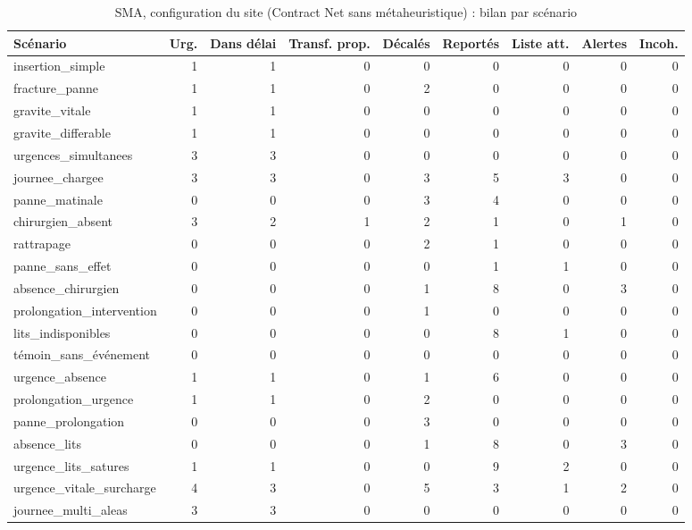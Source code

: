 \begin{table}[htbp]
\centering
\small
\caption{SMA, configuration du site (Contract Net sans métaheuristique) : bilan par scénario}
\label{tab:sma_scenarios}
\begin{tabular}{lrrrrrrrr}
\toprule
Scénario & Urg. & Dans délai & Transf. prop. & Décalés & Reportés & Liste att. & Alertes & Incoh. \\
\midrule
insertion\_simple & 1 & 1 & 0 & 0 & 0 & 0 & 0 & 0 \\
fracture\_panne & 1 & 1 & 0 & 2 & 0 & 0 & 0 & 0 \\
gravite\_vitale & 1 & 1 & 0 & 0 & 0 & 0 & 0 & 0 \\
gravite\_differable & 1 & 1 & 0 & 0 & 0 & 0 & 0 & 0 \\
urgences\_simultanees & 3 & 3 & 0 & 0 & 0 & 0 & 0 & 0 \\
journee\_chargee & 3 & 3 & 0 & 3 & 5 & 3 & 0 & 0 \\
panne\_matinale & 0 & 0 & 0 & 3 & 4 & 0 & 0 & 0 \\
chirurgien\_absent & 3 & 2 & 1 & 2 & 1 & 0 & 1 & 0 \\
rattrapage & 0 & 0 & 0 & 2 & 1 & 0 & 0 & 0 \\
panne\_sans\_effet & 0 & 0 & 0 & 0 & 1 & 1 & 0 & 0 \\
absence\_chirurgien & 0 & 0 & 0 & 1 & 8 & 0 & 3 & 0 \\
prolongation\_intervention & 0 & 0 & 0 & 1 & 0 & 0 & 0 & 0 \\
lits\_indisponibles & 0 & 0 & 0 & 0 & 8 & 1 & 0 & 0 \\
témoin\_sans\_événement & 0 & 0 & 0 & 0 & 0 & 0 & 0 & 0 \\
urgence\_absence & 1 & 1 & 0 & 1 & 6 & 0 & 0 & 0 \\
prolongation\_urgence & 1 & 1 & 0 & 2 & 0 & 0 & 0 & 0 \\
panne\_prolongation & 0 & 0 & 0 & 3 & 0 & 0 & 0 & 0 \\
absence\_lits & 0 & 0 & 0 & 1 & 8 & 0 & 3 & 0 \\
urgence\_lits\_satures & 1 & 1 & 0 & 0 & 9 & 2 & 0 & 0 \\
urgence\_vitale\_surcharge & 4 & 3 & 0 & 5 & 3 & 1 & 2 & 0 \\
journee\_multi\_aleas & 3 & 3 & 0 & 0 & 0 & 0 & 0 & 0 \\
\bottomrule
\end{tabular}
\end{table}
